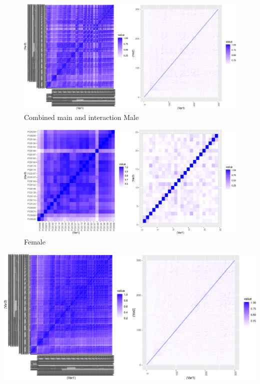 \documentclass[]{article}
\begin{document}
\begin{figure}
\centering
\includegraphics{PCBs_covariance_files/figure-latex/unnamed-chunk-30-1.pdf}
\caption{Combined main and interaction Male}
\end{figure}

\begin{figure}
\centering
\includegraphics{PCBs_covariance_files/figure-latex/unnamed-chunk-31-1.pdf}
\caption{Female}
\end{figure}

\includegraphics{PCBs_covariance_files/figure-latex/unnamed-chunk-32-1.pdf}
\end{document}
